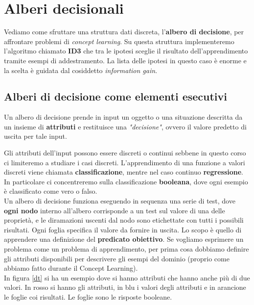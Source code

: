 \chapter{Alberi decisionali}
\label{Capitolo 3}
Vediamo come sfruttare una struttura dati discreta, l'\textbf{albero di
  decisione}, per affrontare problemi di \textit{concept learning}. Su questa
struttura implementeremo l'algoritmo chiamato \textbf{ID3} che tra le ipotesi
sceglie il risultato dell'apprendimento tramite esempi di addestramento. La
lista delle ipotesi in questo caso è enorme e la scelta è guidata dal cosiddetto
\textit{information gain}.
\section{Alberi di decisione come elementi esecutivi}
\begin{definizione}
Un albero di decisione prende in input un oggetto o una situazione descritta da un insieme di \textbf{attributi} e restituisce una \textit{"decisione"}, ovvero il valore predetto di uscita per tale input.
\end{definizione}
Gli attributi dell'input possono essere discreti o continui sebbene in questo corso ci limiteremo a studiare i casi discreti. L'apprendimento di una funzione a valori discreti viene chiamata \textbf{classificazione}, mentre nel caso continuo \textbf{regressione}. In particolare ci concentreremo sulla classificazione \textbf{booleana}, dove ogni esempio è classificato come vero o falso.\\  Un albero di decisione funziona eseguendo in sequenza una serie di test, dove \textbf{ogni nodo} interno all'albero corrisponde a un test sul valore di una delle proprietà, e le diramazioni uscenti dal nodo sono etichettate con tutti i possibili risultati. Ogni foglia specifica il valore da fornire in uscita. Lo scopo è quello di apprendere una definizione del \textbf{predicato obiettivo}. Se vogliamo esprimere un problema come un problema di apprendimento, per prima cosa dobbiamo definire gli attributi disponibili per descrivere gli esempi del dominio (proprio come abbiamo fatto durante il Concept Learning).\\
In figura \ref{dt} si ha un esempio dove si hanno attributi che hanno anche più di due valori. In rosso si hanno gli
attributi, in blu i valori degli attributi e in arancione le foglie coi
risultati. Le foglie sono le risposte booleane.
